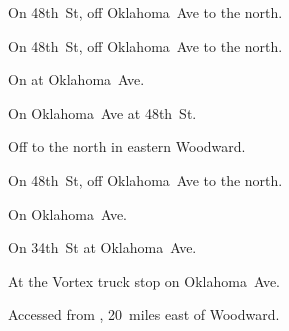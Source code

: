 
\begin{LocationList}

On 48th~St, off  Oklahoma~Ave to the north.

On 48th~St, off  Oklahoma~Ave to the north.

On   at  Oklahoma~Ave.

\Location{\GarageHQ \Garage}
On  Oklahoma~Ave at 48th~St.

Off  to the north in eastern Woodward.

On 48th~St, off  Oklahoma~Ave to the north.

On  Oklahoma~Ave.

\Location{\TruckService \Service}
On 34th~St at   Oklahoma~Ave.


At the Vortex truck stop on   Oklahoma~Ave.

Accessed from , 20~miles east of Woodward.

\end{LocationList}

